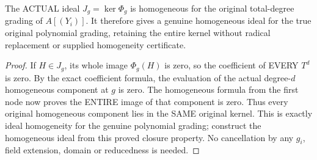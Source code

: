 \begin{theorem}
\label{algebra:actual-rees-homogeneous-kernel}
\leanok
{}
The ACTUAL ideal $J_g=\ker\Phi_g$ is homogeneous for the original total-degree
grading of $A[(Y_i)]$. It therefore gives a genuine homogeneous ideal for
the true original polynomial grading, retaining the entire kernel without
radical replacement or supplied homogeneity certificate.
\end{theorem}
\begin{proof}
If $H\in J_g$, its whole image $\Phi_g(H)$ is zero, so the coefficient of
EVERY $T^d$ is zero. By the exact coefficient formula, the evaluation of the
actual degree-$d$ homogeneous component at $g$ is zero. The homogeneous
formula from the first node now proves the ENTIRE image of that component
is zero. Thus every original homogeneous component lies in the SAME original
kernel. This is exactly ideal homogeneity for the genuine polynomial grading;
construct the homogeneous ideal from this proved closure property.
No cancellation by any $g_i$, field extension, domain or reducedness is needed.
\end{proof}

